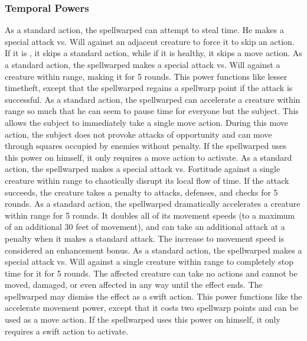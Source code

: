 \subsubsection{Temporal Powers}
 As a standard action, the spellwarped can attempt to steal time. He makes a special attack vs. Will against an adjacent creature to force it to skip an action. If it is \bloodied, it skips a standard action, while if it is healthy, it skips a move action.
 As a standard action, the spellwarped makes a special attack vs. Will against a creature within \rngclose range, making it \slowed for 5 rounds.
 This power functions like lesser timetheft, except that the spellwarped regains a spellwarp point if the attack is successful.
 As a standard action, the spellwarped can accelerate a creature within \rngclose range so much that he can seem to pause time for everyone but the subject. This allows the subject to immediately take a single move action. During this move action, the subject does not provoke attacks of opportunity and can move through squares occupied by enemies without penalty. If the spellwarped uses this power on himself, it only requires a move action to activate.
 As a standard action, the spellwarped makes a special attack vs. Fortitude against a single creature within \rngmed range to chaotically disrupt its local flow of time. If the attack succeeds, the creature takes a  penalty to attacks, defenses, and checks for 5 rounds.
 As a standard action, the spellwarped dramatically accelerates a creature within \rngclose range for 5 rounds. It doubles all of its movement speeds (to a maximum of an additional 30 feet of movement), and can take an additional attack at a  penalty when it makes a standard attack. The increase to movement speed is considered an enhancement bonus.
 As a standard action, the spellwarped makes a special attack vs. Will against a single creature within \rngclose range to completely stop time for it for 5 rounds. The affected creature can take no actions and cannot be moved, damaged, or even affected in any way until the effect ends. The spellwarped may dismiss the effect as a swift action.
 This power functions like the accelerate movement power, except that it costs two spellwarp points and can be used as a move action. If the spellwarped uses this power on himself, it only requires a swift action to activate.
